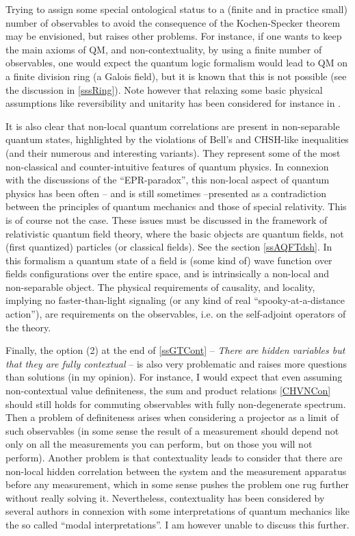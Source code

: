 Trying to assign some special ontological status to a (finite and in practice small) number of observables to avoid the consequence of the Kochen-Specker theorem may be envisioned, but raises other problems. 
For instance, if one wants to keep the main axioms of QM, and non-contextuality, by using a finite number of observables, one would expect the quantum logic formalism would lead to QM on a finite division ring (a Galois field), but it is known that this is not possible (see the discussion in \ref{sssRing}).
Note however that relaxing some basic physical assumptions like reversibility and unitarity has been considered for instance in \cite{tHooft2007}.

It is also clear that non-local quantum correlations are present in non-separable quantum states, highlighted by the violations of Bell's and CHSH-like inequalities (and their numerous and interesting variants). They represent some of the most non-classical and counter-intuitive features of quantum physics.
In connexion with the discussions of the ``EPR-paradox'', this non-local aspect of quantum physics has been often -- and is still sometimes --presented as  a contradiction between the principles of quantum mechanics and those of special relativity.
This is of course not the case.
These issues must be discussed in the framework of relativistic quantum field theory, where the basic objects are quantum fields, not (first quantized) particles (or classical fields).
See the section \ref{ssAQFTdsh}.
In this formalism a quantum state of a field is (some kind of) wave function over fields configurations over the entire space, and is intrinsically a non-local and non-separable object. 
The physical requirements of causality, and locality, implying no faster-than-light signaling (or any kind of real ``spooky-at-a-distance action''), are requirements on the observables, i.e. on the self-adjoint operators of the theory.

Finally, the option (2) at the end of \ref{ssGTCont} -- \textit{There are hidden variables but that they are fully contextual} -- is also very problematic and raises more questions than solutions (in my opinion). 
For instance, I would expect that even assuming non-contextual value definiteness, the sum and product relations \ref{CHVNCon} should still holds for commuting observables with fully non-degenerate spectrum. Then a problem of definiteness arises when considering a projector as a limit of such observables (in some sense the result of a measurement should depend not only on all the measurements you can perform, but on those you will not perform).
Another problem is that contextuality leads to consider that there are non-local hidden correlation between the system and the measurement apparatus before any measurement, which in some sense pushes the problem one rug further without really solving it.
Nevertheless, contextuality has been considered by several authors in connexion with some interpretations of quantum mechanics like the so called ``modal interpretations''. I am however unable to discuss this further.

